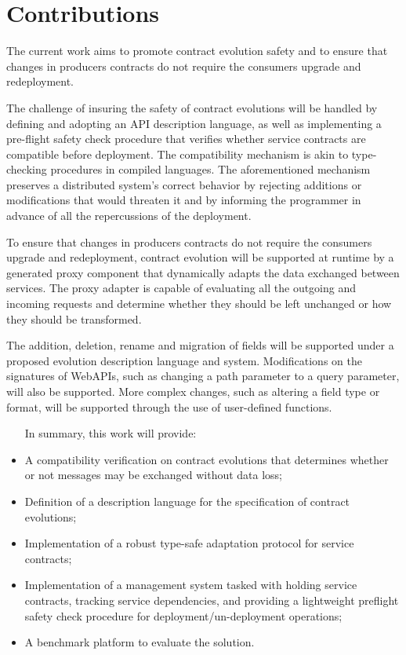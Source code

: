 \section{Contributions} %
\label{sec:contributions}

The current work aims to promote contract evolution safety and to ensure that changes in producers contracts do not require the consumers upgrade and redeployment.

The challenge of insuring the safety of contract evolutions will be handled by defining and adopting an API description language, as well as implementing
a pre-flight safety check procedure that verifies whether service contracts are compatible before deployment.
The compatibility mechanism is akin to type-checking procedures in compiled languages.
The aforementioned mechanism preserves a distributed system's correct behavior by rejecting additions or modifications that would threaten it and by informing the programmer in advance
of all the repercussions of the deployment.

To ensure that changes in producers contracts do not require the consumers upgrade and redeployment, contract evolution
will be supported at runtime by a generated proxy component that dynamically adapts the data exchanged between services.
The proxy adapter is capable of evaluating all the outgoing and incoming requests and determine whether
they should be left unchanged or how they should be transformed.

The addition, deletion, rename and migration of fields will be supported under a proposed evolution description language and system.
Modifications on the signatures of WebAPIs, such as changing a path parameter to a query parameter, will also be supported.
More complex changes, such as altering a field type or format,
will be supported through the use of user-defined functions.
\begin{itemize}
    \setlength\itemsep{0em}
    \item [In summary, this work will provide:]
    \item A compatibility verification on contract evolutions that determines whether or not messages may be exchanged without data loss;
    \item Definition of a description language for the specification of contract evolutions;
    \item Implementation of a robust type-safe adaptation protocol for service contracts;
    \item Implementation of a management system tasked with holding service contracts, tracking service dependencies,
    and providing a lightweight preflight safety check procedure for deployment/un-deployment operations;
    \item A benchmark platform to evaluate the solution.
\end{itemize}

